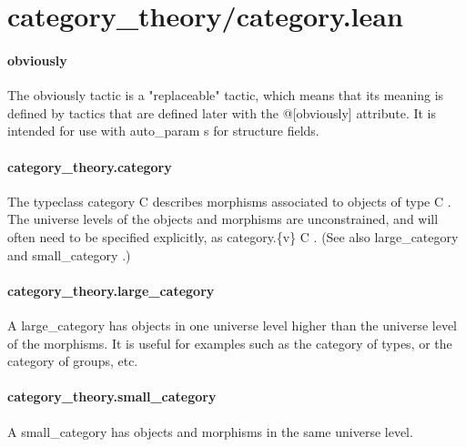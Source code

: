 \documentclass{article}
\begin{document}
\section{category\_theory/category.lean}\paragraph{obviously}
\par
The 
\colorbox[RGB]{253,246,227}{{{{\color[RGB]{101, 123, 131} obviously }}}} tactic is a "replaceable" tactic, which means that its meaning is defined by tactics that are defined later with the 
\colorbox[RGB]{253,246,227}{{{{\color[RGB]{88, 110, 117} @{[}obviously{]} }}}} attribute. It is intended for use with 
\colorbox[RGB]{253,246,227}{{{{\color[RGB]{101, 123, 131} auto\_param }}}}s for structure fields.
\paragraph{category\_theory.category}
\par
The typeclass 
\colorbox[RGB]{253,246,227}{{{{\color[RGB]{101, 123, 131} category C }}}} describes morphisms associated to objects of type 
\colorbox[RGB]{253,246,227}{{{{\color[RGB]{101, 123, 131} C }}}}.
The universe levels of the objects and morphisms are unconstrained, and will often need to be
specified explicitly, as 
\colorbox[RGB]{253,246,227}{{{{\color[RGB]{101, 123, 131} category.\{v\} C }}}}. (See also 
\colorbox[RGB]{253,246,227}{{{{\color[RGB]{101, 123, 131} large\_category }}}} and 
\colorbox[RGB]{253,246,227}{{{{\color[RGB]{101, 123, 131} small\_category }}}}.)
\paragraph{category\_theory.large\_category}
\par
A 
\colorbox[RGB]{253,246,227}{{{{\color[RGB]{101, 123, 131} large\_category }}}} has objects in one universe level higher than the universe level of
the morphisms. It is useful for examples such as the category of types, or the category
of groups, etc.
\paragraph{category\_theory.small\_category}
\par
A 
\colorbox[RGB]{253,246,227}{{{{\color[RGB]{101, 123, 131} small\_category }}}} has objects and morphisms in the same universe level.
\end{document}
